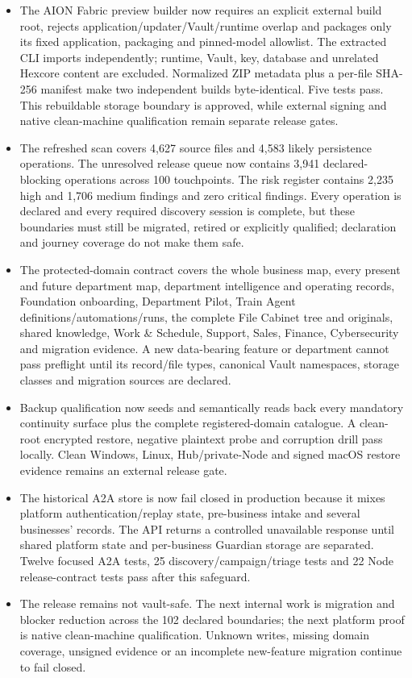 \documentclass[11pt]{article}
\begin{document}
\begin{itemize}
  \item The AION Fabric preview builder now requires an explicit external build root, rejects application/updater/Vault/runtime overlap and packages only its fixed application, packaging and pinned-model allowlist. The extracted CLI imports independently; runtime, Vault, key, database and unrelated Hexcore content are excluded. Normalized ZIP metadata plus a per-file SHA-256 manifest make two independent builds byte-identical. Five tests pass. This rebuildable storage boundary is approved, while external signing and native clean-machine qualification remain separate release gates.
  \item The refreshed scan covers 4,627 source files and 4,583 likely persistence operations. The unresolved release queue now contains 3,941 declared-blocking operations across 100 touchpoints. The risk register contains 2,235 high and 1,706 medium findings and zero critical findings. Every operation is declared and every required discovery session is complete, but these boundaries must still be migrated, retired or explicitly qualified; declaration and journey coverage do not make them safe.
  \item The protected-domain contract covers the whole business map, every present and future department map, department intelligence and operating records, Foundation onboarding, Department Pilot, Train Agent definitions/automations/runs, the complete File Cabinet tree and originals, shared knowledge, Work \& Schedule, Support, Sales, Finance, Cybersecurity and migration evidence. A new data-bearing feature or department cannot pass preflight until its record/file types, canonical Vault namespaces, storage classes and migration sources are declared.
  \item Backup qualification now seeds and semantically reads back every mandatory continuity surface plus the complete registered-domain catalogue. A clean-root encrypted restore, negative plaintext probe and corruption drill pass locally. Clean Windows, Linux, Hub/private-Node and signed macOS restore evidence remains an external release gate.
  \item The historical A2A store is now fail closed in production because it mixes platform authentication/replay state, pre-business intake and several businesses' records. The API returns a controlled unavailable response until shared platform state and per-business Guardian storage are separated. Twelve focused A2A tests, 25 discovery/campaign/triage tests and 22 Node release-contract tests pass after this safeguard.
  \item The release remains \textcolor{TessarisRed}{not vault-safe}. The next internal work is migration and blocker reduction across the 102 declared boundaries; the next platform proof is native clean-machine qualification. Unknown writes, missing domain coverage, unsigned evidence or an incomplete new-feature migration continue to fail closed.
\end{itemize}
\end{document}
